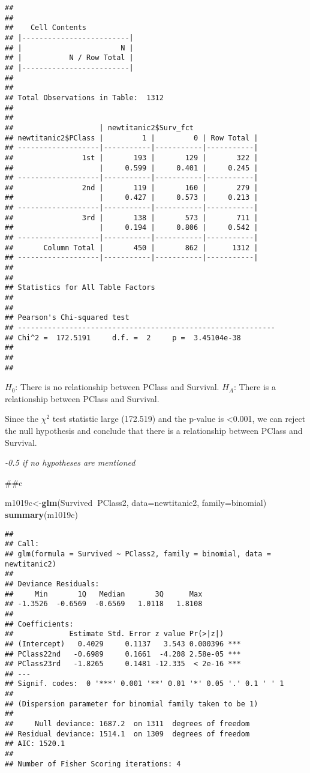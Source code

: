 \documentclass[]{article}
\newenvironment{Shaded}{\begin{snugshade}}{\end{snugshade}}
\newcommand{\DataTypeTok}[1]{\textcolor[rgb]{0.13,0.29,0.53}{#1}}
\newcommand{\KeywordTok}[1]{\textcolor[rgb]{0.13,0.29,0.53}{\textbf{#1}}}
\newcommand{\NormalTok}[1]{#1}
\newcommand{\OperatorTok}[1]{\textcolor[rgb]{0.81,0.36,0.00}{\textbf{#1}}}
\begin{document}
\begin{verbatim}
## 
##  
##    Cell Contents
## |-------------------------|
## |                       N |
## |           N / Row Total |
## |-------------------------|
## 
##  
## Total Observations in Table:  1312 
## 
##  
##                    | newtitanic2$Surv_fct 
## newtitanic2$PClass |         1 |         0 | Row Total | 
## -------------------|-----------|-----------|-----------|
##                1st |       193 |       129 |       322 | 
##                    |     0.599 |     0.401 |     0.245 | 
## -------------------|-----------|-----------|-----------|
##                2nd |       119 |       160 |       279 | 
##                    |     0.427 |     0.573 |     0.213 | 
## -------------------|-----------|-----------|-----------|
##                3rd |       138 |       573 |       711 | 
##                    |     0.194 |     0.806 |     0.542 | 
## -------------------|-----------|-----------|-----------|
##       Column Total |       450 |       862 |      1312 | 
## -------------------|-----------|-----------|-----------|
## 
##  
## Statistics for All Table Factors
## 
## 
## Pearson's Chi-squared test 
## ------------------------------------------------------------
## Chi^2 =  172.5191     d.f. =  2     p =  3.45104e-38 
## 
## 
## 
\end{verbatim}

\(H_0\): There is no relationship between PClass and Survival. \(H_A\):
There is a relationship between PClass and Survival.

Since the \(\chi^2\) test statistic large (172.519) and the p-value is
\textless{}0.001, we can reject the null hypothesis and conclude that
there is a relationship between PClass and Survival.

\emph{-0.5 if no hypotheses are mentioned }

\#\#c

\begin{Shaded}
\begin{Highlighting}[]
\NormalTok{m1019c<-}\KeywordTok{glm}\NormalTok{(Survived}\OperatorTok{~}\NormalTok{PClass2, }\DataTypeTok{data=}\NormalTok{newtitanic2, }\DataTypeTok{family=}\NormalTok{binomial)}
\KeywordTok{summary}\NormalTok{(m1019c)}
\end{Highlighting}
\end{Shaded}

\begin{verbatim}
## 
## Call:
## glm(formula = Survived ~ PClass2, family = binomial, data = newtitanic2)
## 
## Deviance Residuals: 
##     Min       1Q   Median       3Q      Max  
## -1.3526  -0.6569  -0.6569   1.0118   1.8108  
## 
## Coefficients:
##             Estimate Std. Error z value Pr(>|z|)    
## (Intercept)   0.4029     0.1137   3.543 0.000396 ***
## PClass22nd   -0.6989     0.1661  -4.208 2.58e-05 ***
## PClass23rd   -1.8265     0.1481 -12.335  < 2e-16 ***
## ---
## Signif. codes:  0 '***' 0.001 '**' 0.01 '*' 0.05 '.' 0.1 ' ' 1
## 
## (Dispersion parameter for binomial family taken to be 1)
## 
##     Null deviance: 1687.2  on 1311  degrees of freedom
## Residual deviance: 1514.1  on 1309  degrees of freedom
## AIC: 1520.1
## 
## Number of Fisher Scoring iterations: 4
\end{verbatim}
\end{document}
